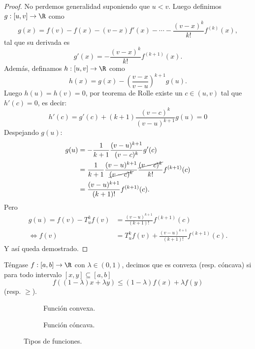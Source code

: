 \documentclass[11pt,oneside,a4paper]{book}
\begin{document}
\begin{proof}
No perdemos generalidad suponiendo que $u\lt v$. Luego definimos $g:[u,v]\rightarrow\R$ como
$$g(x)=f(v)-f(x)-(v-x)f'(x)-\cdots-\frac{(v-x)^k}{k!}f^{(k)}(x),$$
tal que su derivada es
$$g'(x)=-\frac{(v-x)^k}{k!}f^{(k+1)}(x).$$
Además, definamos $h:[u,v]\rightarrow\R$ como
$$h(x)=g(x)-\left(\frac{v-x}{v-u}\right)^{k+1}g(u).$$
Luego $h(u)=h(v)=0$, por teorema de Rolle existe un $c\in(u,v)$ tal que $h'(c)=0$, es decir:
$$h'(c)=g'(c)+(k+1)\frac{(v-c)^k}{(v-u)^{k+1}}g(u)=0$$
Despejando $g(u)$:
\begin{align*}
g(u)&=-\frac{1}{k+1}\frac{(v-u)^{k+1}}{(v-c)^k}g'(c)\\
&=\frac{1}{k+1}\frac{(v-u)^{k+1}}{\cancel{(v-c)^k}}\frac{\cancel{(v-c)^k}}{k!}f^{(k+1)}(c)\\
&=\frac{(v-u)^{k+1}}{(k+1)!}f^{(k+1)}(c).
\end{align*}
Pero
\begin{align*}
g(u)=f(v)-T^k_uf(v)&=\frac{(v-u)^{k+1}}{(k+1)!}f^{(k+1)}(c)\\
\iff f(v)&=T^k_uf(v)+\frac{(v-u)^{k+1}}{(k+1)!}f^{(k+1)}(c).
\end{align*}
Y así queda demostrado.
\end{proof}
\begin{mydef}
Téngase $f:[a,b]\rightarrow\R$ con $\lambda\in(0,1)$, decimos que es convexa (resp. cóncava) si para todo intervalo $[x,y]\subseteq[a,b]$
$$f\left((1-\lambda)x+\lambda y\right)\leq(1-\lambda)f(x)+\lambda f(y)$$
(resp. $\geq$).
\end{mydef}
\begin{figure}
\centering
\begin{subfigure}{.49\textwidth}
\caption{Función convexa.}
\end{subfigure}
\begin{subfigure}{.49\textwidth}
\caption{Función cóncava.}
\end{subfigure}
\caption{Tipos de funciones.}
\end{figure}
\end{document}
